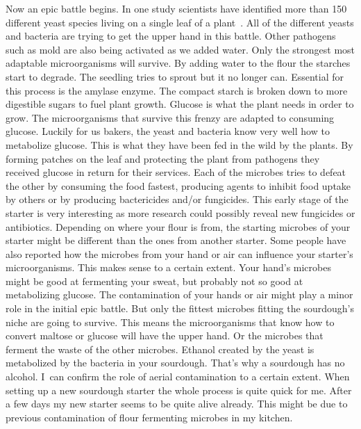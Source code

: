 Now an epic battle begins. In one study scientists
have identified more than 150 different yeast species living
on a single leaf of a plant~\cite{yeasts+biocontrol+agent}.
All of the different yeasts and bacteria are trying to get
the upper hand in this battle. Other pathogens such as mold
are also being activated as we added water. Only the strongest
most adaptable microorganisms will survive. By adding water to the
flour the starches start to degrade. The seedling tries to
sprout but it no longer can. Essential for this process is the
amylase enzyme. The compact starch is broken down to more
digestible sugars to fuel plant growth. Glucose is what the
plant needs in order to grow. The microorganisms that survive
this frenzy are adapted to consuming glucose. Luckily for us
bakers, the yeast and bacteria know very well how to metabolize
glucose. This is what they have been fed in the wild by the plants.
By forming patches on the leaf and protecting the plant from
pathogens they received glucose in return for their services.
Each of the microbes tries to defeat the other by consuming the
food fastest, producing agents to inhibit food uptake by others or by producing
bactericides and/or fungicides. This early stage of the starter
is very interesting as more research could possibly reveal
new fungicides or antibiotics. Depending on where your flour
is from, the starting microbes of your starter might be different
than the ones from another starter. Some people have also reported
how the microbes from your hand or air can influence your starter's
microorganisms. This makes sense to a certain extent. Your
hand's microbes might be good at fermenting your sweat, but
probably not so good at metabolizing glucose. The contamination
of your hands or air might play a minor role in the initial epic
battle. But only the fittest microbes fitting the sourdough's
niche are going to survive. This means the microorganisms that know
how to convert maltose or glucose will have the upper hand. Or the
microbes that ferment the waste of the other microbes. Ethanol created
by the yeast is metabolized by the bacteria in your sourdough. That's
why a sourdough has no alcohol. I~can confirm the role of aerial
contamination to a certain extent. When setting up a new sourdough
starter the whole process is quite quick for me. After a few
days my new starter seems to be quite alive already. This might
be due to previous contamination of flour fermenting microbes in
my kitchen.

